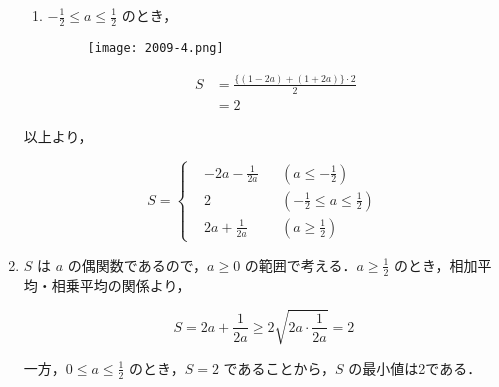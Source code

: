 \documentclass[a4paper]{ltjsarticle}
\begin{document}
\begin{enumerate}[label=(\arabic*)]
\begin{enumerate}[label=(\roman*)]
              \item $-\frac{1}{2}\leq a\leq\frac{1}{2}$ のとき，

                    \begin{figure}[!ht]
                        \centering
                        \texttt{[image: 2009-4.png]}
                    \end{figure}

                    \begin{align*}
                        S & =\frac{\{(1-2a)+(1+2a)\}\cdot 2}{2} \\
                          & =2
                    \end{align*}
          \end{enumerate}

          以上より，

          \begin{equation*}
              S=\left\{\begin{aligned}
                   & -2a-\frac{1}{2a} &  & \left(a\leq -\frac{1}{2}\right)                 \\
                   & 2                &  & \left(-\frac{1}{2}\leq a\leq \frac{1}{2}\right) \\
                   & 2a+\frac{1}{2a}  &  & \left(a\geq \frac{1}{2}\right)
              \end{aligned}\right.
          \end{equation*}

    \item $S$ は $a$ の偶関数であるので，$a\geq 0$ の範囲で考える．$a\geq \frac{1}{2}$ のとき，相加平均・相乗平均の関係より，

          \begin{equation*}
              S=2a+\frac{1}{2a}\geq 2\sqrt{2a\cdot\frac{1}{2a}}=2
          \end{equation*}

          一方，$0\leq a\leq \frac{1}{2}$ のとき，$S=2$ であることから，$S$ の最小値は2である．
\end{enumerate}

\end{document}
